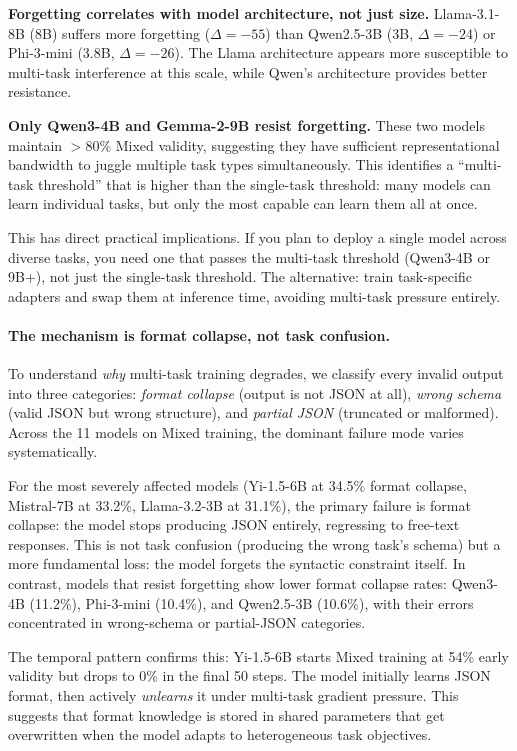 \documentclass[11pt]{article}
\begin{document}
\textbf{Forgetting correlates with model architecture, not just size.} Llama-3.1-8B (8B) suffers more forgetting ($\Delta = -55$) than Qwen2.5-3B (3B, $\Delta = -24$) or Phi-3-mini (3.8B, $\Delta = -26$).  The Llama architecture appears more susceptible to multi-task interference at this scale, while Qwen's architecture provides better resistance.

\textbf{Only Qwen3-4B and Gemma-2-9B resist forgetting.} These two models maintain $>80$\% Mixed validity, suggesting they have sufficient representational bandwidth to juggle multiple task types simultaneously.  This identifies a ``multi-task threshold'' that is higher than the single-task threshold: many models can learn individual tasks, but only the most capable can learn them all at once.

This has direct practical implications.  If you plan to deploy a single model across diverse tasks, you need one that passes the multi-task threshold (Qwen3-4B or 9B+), not just the single-task threshold.  The alternative: train task-specific adapters and swap them at inference time, avoiding multi-task pressure entirely.

\paragraph{The mechanism is format collapse, not task confusion.}
To understand \emph{why} multi-task training degrades, we classify every invalid output into three categories: \emph{format collapse} (output is not JSON at all), \emph{wrong schema} (valid JSON but wrong structure), and \emph{partial JSON} (truncated or malformed).  Across the 11 models on Mixed training, the dominant failure mode varies systematically.

For the most severely affected models (Yi-1.5-6B at 34.5\% format collapse, Mistral-7B at 33.2\%, Llama-3.2-3B at 31.1\%), the primary failure is format collapse: the model stops producing JSON entirely, regressing to free-text responses.  This is not task confusion (producing the wrong task's schema) but a more fundamental loss: the model forgets the syntactic constraint itself.  In contrast, models that resist forgetting show lower format collapse rates: Qwen3-4B (11.2\%), Phi-3-mini (10.4\%), and Qwen2.5-3B (10.6\%), with their errors concentrated in wrong-schema or partial-JSON categories.

The temporal pattern confirms this: Yi-1.5-6B starts Mixed training at 54\% early validity but drops to 0\% in the final 50 steps.  The model initially learns JSON format, then actively \emph{unlearns} it under multi-task gradient pressure.  This suggests that format knowledge is stored in shared parameters that get overwritten when the model adapts to heterogeneous task objectives.
\end{document}
